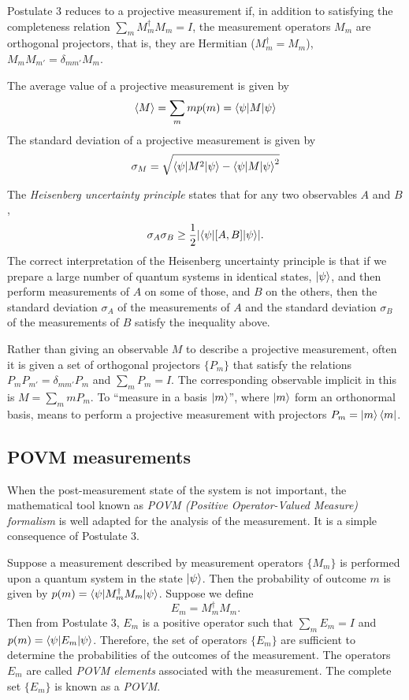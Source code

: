 Postulate 3 reduces to a projective measurement if,
in addition to satisfying the completeness relation $\sum_m M_m^\dagger M_m = I$,
the measurement operators $M_m$ are orthogonal projectors,
that is,
they are Hermitian ($M_m^\dagger = M_m$),
$M_mM_{m'} = \delta_{mm'}M_m$.

The average value of a projective measurement is given by
\[
    \langle M\rangle = \sum_m mp(m) = \braket{\psi|M|\psi}
\]
The standard deviation of a projective measurement is given by
\[
    \sigma_M = \sqrt{\braket{\psi|M^2|\psi} - \braket{\psi|M|\psi}^2}
\]

The \emph{Heisenberg uncertainty principle} states that for any two observables $A$ and $B$,
\[
    \sigma_A \sigma_B \geq \frac{1}{2}\lvert\braket{\psi|[A,B]|\psi}\rvert.
\]
The correct interpretation of the Heisenberg uncertainty principle is that if we prepare a large number of quantum systems in identical states,
$\ket{\psi}$,
and then perform measurements of $A$ on some of those,
and $B$ on the others,
then the standard deviation $\sigma_A$ of the measurements of $A$ and the standard deviation $\sigma_B$ of the measurements of $B$ satisfy the inequality above.

Rather than giving an observable $M$ to describe a projective measurement,
often it is given a set of orthogonal projectors $\{P_m\}$ that satisfy the relations $P_mP_{m'} = \delta_{mm'}P_m$ and $\sum_m P_m = I$.
The corresponding observable implicit in this is $M = \sum_m m P_m$.
To ``measure in a basis $\ket{m}$'',
where $\ket{m}$ form an orthonormal basis,
means to perform a projective measurement with projectors $P_m = \ket{m}\bra{m}$.

\subsection{POVM measurements}
When the post-measurement state of the system is not important,
the mathematical tool known as \emph{POVM (Positive Operator-Valued Measure) formalism} is well adapted for the analysis of the measurement.
It is a simple consequence of Postulate 3.

Suppose a measurement described by measurement operators $\{M_m\}$ is performed upon a quantum system in the state $\ket{\psi}$. 
Then the probability of outcome $m$ is given by $p(m) = \braket{\psi|M_m^\dagger M_m|\psi}$.
Suppose we define
\[
    E_m = M_m^\dagger M_m.
\]
Then from Postulate 3, $E_m$ is a positive operator such that $\sum_m E_m = I$ and $p(m) = \braket{\psi|E_m|\psi}$.
Therefore, the set of operators $\{E_m\}$ are sufficient to determine the probabilities of the outcomes of the measurement.
The operators $E_m$ are called \emph{POVM elements} associated with the measurement.
The complete set $\{E_m\}$ is known as a \emph{POVM}.

